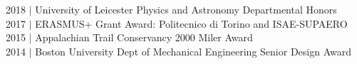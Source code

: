 2018 $\vert$ University of Leicester Physics and Astronomy Departmental Honors\\
2017 $\vert$ ERASMUS+ Grant Award: Politecnico di Torino and ISAE-SUPAERO\\
2015 $\vert$ Appalachian Trail Conservancy 2000 Miler Award\\
2014 $\vert$ Boston University Dept of Mechanical Engineering Senior Design Award\\ 
